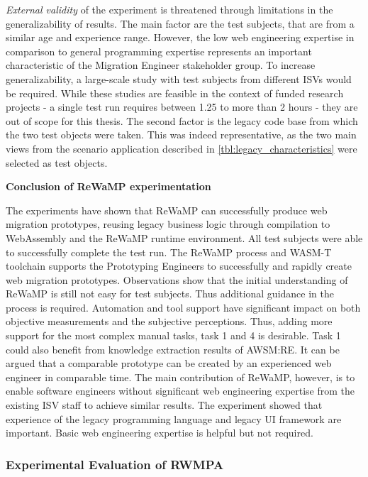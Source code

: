\emph{External validity} of the experiment is threatened through limitations in the generalizability of results.
The main factor are the test subjects, that are from a similar age and experience range.
However, the low web engineering expertise in comparison to general programming expertise represents an important characteristic of the Migration Engineer stakeholder group.
To increase generalizability, a large-scale study with test subjects from different ISVs would be required.
While these studies are feasible in the context of funded research projects - a single test run requires between 1.25 to more than 2 hours - they are out of scope for this thesis.
The second factor is the legacy code base from which the two test objects were taken.
This was indeed representative, as the two main views from the scenario application described in \cref{tbl:legacy_characteristics} were selected as test objects.

\textbf{Conclusion of ReWaMP experimentation}

The experiments have shown that ReWaMP can successfully produce web migration prototypes, reusing legacy business logic through compilation to WebAssembly and the ReWaMP runtime environment.
All test subjects were able to successfully complete the test run.
The ReWaMP process and WASM-T toolchain supports the Prototyping Engineers to successfully and rapidly create web migration prototypes.
Observations show that the initial understanding of ReWaMP is still not easy for test subjects.
Thus additional guidance in the process is required.
Automation and tool support have significant impact on both objective measurements and the subjective perceptions.
Thus, adding more support for the most complex manual tasks, task 1 and 4 is desirable.
Task 1 could also benefit from knowledge extraction results of AWSM:RE.
It can be argued that a comparable prototype can be created by an experienced web engineer in comparable time.
The main contribution of ReWaMP, however, is to enable software engineers without significant web engineering expertise from the existing ISV staff to achieve similar results.
The experiment showed that experience of the legacy programming language and legacy UI framework are important.
Basic web engineering expertise is helpful but not required.

\hypertarget{experimental-evaluation-of-rwmpa}{%
\subsubsection{Experimental Evaluation of RWMPA}\label{experimental-evaluation-of-rwmpa}}

